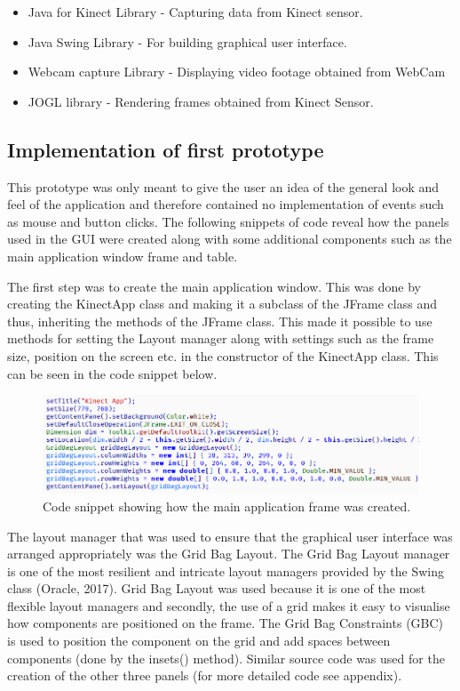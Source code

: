 \documentclass[a4paper, 12pt]{article}
\begin{document}
\begin{itemize}
 \item Java for Kinect Library - Capturing data from Kinect sensor.
 \item Java Swing Library - For building graphical user interface.
 \item Webcam capture Library - Displaying video footage obtained from WebCam
 \item JOGL library - Rendering frames obtained from Kinect Sensor.  
\end{itemize}


\subsection{Implementation of first prototype}

This prototype was only meant to give the user an idea of the general look and feel of the application and therefore contained no implementation of events such as mouse and button clicks. The following snippets of code reveal how the panels used in the GUI were created along with some additional components such as the main application window frame and table.  

The first step was to create the main application window. This was done by creating the KinectApp class and making it a subclass of the JFrame class and thus, inheriting the methods of the JFrame class. This made it possible to use methods for setting the Layout manager along with settings such as the frame size, position on the screen etc. in the constructor of the KinectApp class. This can be seen in the code snippet below. 

\begin{figure}[!htb]
	\begin{center}
  \includegraphics[scale=0.7]{codesnippet5.png}
  	\caption{Code snippet showing how the main application frame was created.}
  \end{center} 
  \label{fig: codesnippet1} 
\end{figure}

The layout manager that was used to ensure that the graphical user interface was arranged appropriately was the Grid Bag Layout. The Grid Bag Layout manager is one of the most resilient and intricate layout managers provided by the Swing class (Oracle, 2017). Grid Bag Layout was used because it is one of the most flexible layout managers and secondly, the use of a grid makes it easy to visualise how components are positioned on the frame. The Grid Bag Constraints (GBC) is used to position the component on the grid and add spaces between components (done by the insets() method). Similar source code was used for the creation of the other three panels (for more detailed code see appendix). 
\end{document}
